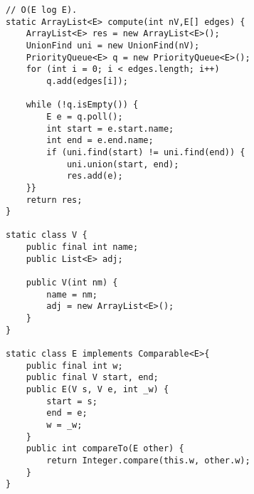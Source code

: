 \begin{verbatim}
// O(E log E).
static ArrayList<E> compute(int nV,E[] edges) {
	ArrayList<E> res = new ArrayList<E>();
	UnionFind uni = new UnionFind(nV);
	PriorityQueue<E> q = new PriorityQueue<E>();
	for (int i = 0; i < edges.length; i++)
		q.add(edges[i]);
		
	while (!q.isEmpty()) {
		E e = q.poll();
		int start = e.start.name;
		int end = e.end.name;
		if (uni.find(start) != uni.find(end)) {
			uni.union(start, end);
			res.add(e);
	}}
	return res;
}
	
static class V {
	public final int name;
	public List<E> adj;
	
	public V(int nm) {
		name = nm;
		adj = new ArrayList<E>();
	}
}
	
static class E implements Comparable<E>{
	public final int w;
	public final V start, end;
	public E(V s, V e, int _w) {
		start = s;
		end = e;
		w = _w;
	}	
	public int compareTo(E other) {
		return Integer.compare(this.w, other.w);
	}
}
\end{verbatim}
